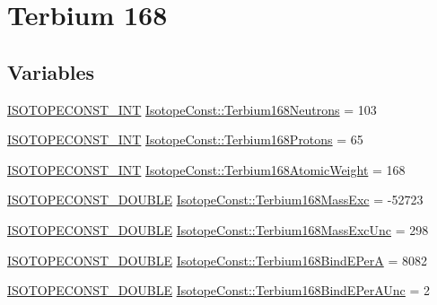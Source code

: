 \hypertarget{group___isotope_const-_terbium-_tb168}{}\section{Terbium 168}
\label{group___isotope_const-_terbium-_tb168}
\subsection*{Variables}
\begin{DoxyCompactItemize}
\item 
\mbox{\hyperlink{group___isotope_const-_macros_ga5f18360b3e99483a35c32d789e62621c}{I\+S\+O\+T\+O\+P\+E\+C\+O\+N\+S\+T\+\_\+\+I\+NT}} \mbox{\hyperlink{group___isotope_const-_terbium-_tb168_gae8aa35448dca27df708309879481df8a}{Isotope\+Const\+::\+Terbium168\+Neutrons}} = 103
\item 
\mbox{\hyperlink{group___isotope_const-_macros_ga5f18360b3e99483a35c32d789e62621c}{I\+S\+O\+T\+O\+P\+E\+C\+O\+N\+S\+T\+\_\+\+I\+NT}} \mbox{\hyperlink{group___isotope_const-_terbium-_tb168_gaea9c2527d499f468c3a9c2ba805fdc92}{Isotope\+Const\+::\+Terbium168\+Protons}} = 65
\item 
\mbox{\hyperlink{group___isotope_const-_macros_ga5f18360b3e99483a35c32d789e62621c}{I\+S\+O\+T\+O\+P\+E\+C\+O\+N\+S\+T\+\_\+\+I\+NT}} \mbox{\hyperlink{group___isotope_const-_terbium-_tb168_ga1775651ef6b207f294fa8699eb098224}{Isotope\+Const\+::\+Terbium168\+Atomic\+Weight}} = 168
\item 
\mbox{\hyperlink{group___isotope_const-_macros_ga8f45a7272ce02c0b4c65c44636ed719a}{I\+S\+O\+T\+O\+P\+E\+C\+O\+N\+S\+T\+\_\+\+D\+O\+U\+B\+LE}} \mbox{\hyperlink{group___isotope_const-_terbium-_tb168_ga96fd6788f6524dc7fffa3103a18ac4cf}{Isotope\+Const\+::\+Terbium168\+Mass\+Exc}} = -\/52723
\item 
\mbox{\hyperlink{group___isotope_const-_macros_ga8f45a7272ce02c0b4c65c44636ed719a}{I\+S\+O\+T\+O\+P\+E\+C\+O\+N\+S\+T\+\_\+\+D\+O\+U\+B\+LE}} \mbox{\hyperlink{group___isotope_const-_terbium-_tb168_ga9d15ef2127c21d7765a4f82a16cbcf69}{Isotope\+Const\+::\+Terbium168\+Mass\+Exc\+Unc}} = 298
\item 
\mbox{\hyperlink{group___isotope_const-_macros_ga8f45a7272ce02c0b4c65c44636ed719a}{I\+S\+O\+T\+O\+P\+E\+C\+O\+N\+S\+T\+\_\+\+D\+O\+U\+B\+LE}} \mbox{\hyperlink{group___isotope_const-_terbium-_tb168_ga817dd43442b309b5219c7ba9a2afcaf2}{Isotope\+Const\+::\+Terbium168\+Bind\+E\+PerA}} = 8082
\item 
\mbox{\hyperlink{group___isotope_const-_macros_ga8f45a7272ce02c0b4c65c44636ed719a}{I\+S\+O\+T\+O\+P\+E\+C\+O\+N\+S\+T\+\_\+\+D\+O\+U\+B\+LE}} \mbox{\hyperlink{group___isotope_const-_terbium-_tb168_ga0b21aab7239b532fc11b2ebc94a650c9}{Isotope\+Const\+::\+Terbium168\+Bind\+E\+Per\+A\+Unc}} = 2

\end{DoxyCompactItemize}

